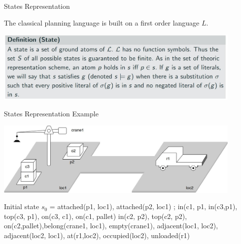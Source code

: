 \documentclass[9pt]{beamer}
\begin{document}
\begin{frame}{States Representation}
\begin{small}

The classical planning language is built on a first order language $L$.

\begin{center}
\includegraphics[keepaspectratio, width=0.90\textwidth]{images/automated_planning_state_def.jpg}
\end{center}

\end{small}
\end{frame}

\begin{frame}{States Representation Example}
\begin{small}

\begin{center}
\includegraphics[keepaspectratio, width=0.90\textwidth]{images/automated_planning_example2.jpg}
\end{center}

{\footnotesize Initial state $s_0$ = {attached(p1, loc1), attached(p2, loc1) ; in(c1, p1, in(c3,p1), top(c3, p1), on(c3, c1), on(c1, pallet) in(c2, p2), top(c2, p2), on(c2,pallet),belong(crane1, loc1), empty(crane1), adjacent(loc1, loc2), adjacent(loc2, loc1), at(r1,loc2), occupied(loc2), unloaded(r1)}}
\end{small}
\end{frame}
\end{document}
